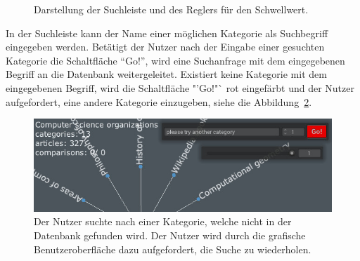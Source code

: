\begin{figure}
    \centering
    \caption{Darstellung der Suchleiste und des Reglers für den Schwellwert.}
    \label{fig:searchbar}
\end{figure}

In der Suchleiste kann der Name einer möglichen Kategorie als Suchbegriff eingegeben werden.
Betätigt der Nutzer nach der Eingabe einer gesuchten Kategorie die Schaltfläche "`Go!"', wird eine Suchanfrage mit dem eingegebenen Begriff an die Datenbank weitergeleitet.
Existiert keine Kategorie mit dem eingegebenen Begriff, wird die Schaltfläche "'Go!"` rot eingefärbt und der Nutzer aufgefordert, eine andere Kategorie einzugeben, siehe die Abbildung~\ref{fig:wrong-cat}.

\begin{figure}[H]
    \centering
    \includegraphics[scale=.5]{images/wrong-cat-small}
    \caption{Der Nutzer suchte nach einer Kategorie, welche nicht in der Datenbank gefunden wird. Der Nutzer wird durch die grafische Benutzeroberfläche dazu aufgefordert, die Suche zu wiederholen.}
    \label{fig:wrong-cat}
\end{figure}


